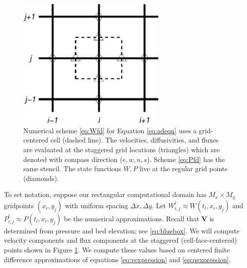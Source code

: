 \documentclass[11pt,final]{amsart}
\newcommand\bV{\mathbf{V}}
\newcommand{\Wlij}{W^l_{i,j}}
\newcommand{\Plij}{P^l_{i,j}}
\begin{document}
\begin{figure}[ht]
\centering
\includegraphics[width=2.9in,keepaspectratio=true]{diffstencil}
\bigskip
\caption{Numerical scheme \eqref{eq:Wfd} for Equation \eqref{eq:adeqn} uses a grid-centered cell (dashed line).  The velocities, diffusivities, and fluxes are evaluated at the staggered grid locations (triangles) which are denoted with compass direction ($e,w,n,s$).  Scheme \eqref{eq:Pfd} has the same stencil.  The state functions $W,P$ live at the regular grid points (diamonds).}
\label{fig:stencil}
\end{figure}

To set notation, suppose our rectangular computational domain has $M_x \times M_y$ gridpoints $(x_i,y_j)$ with uniform spacing $\Delta x,\Delta y$.  Let $\Wlij \approx W(t_l,x_i,y_j)$ and $\Plij \approx P(t_l,x_i,y_j)$ be the numerical approximations.  Recall that $\bV$ is determined from pressure and bed elevation; see \eqref{eq:bluebox}.  We will compute velocity components and flux components at the staggered (cell-face-centered) points shown in Figure \ref{fig:stencil}.  We compute these values based on centered finite difference approximations of equations \eqref{eq:vexpression} and \eqref{eq:qexpression}.
\end{document}
